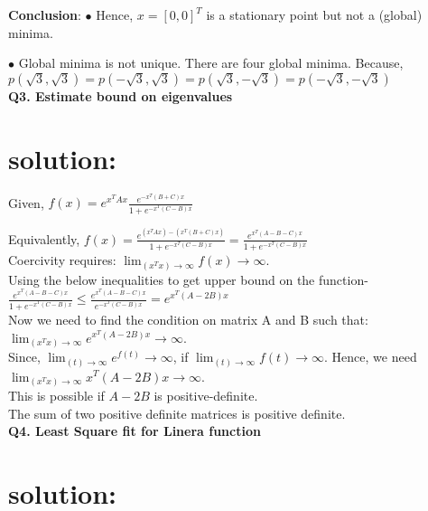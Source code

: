 \documentclass{article}%
\begin{document}
\textbf{Conclusion}: 
$\bullet$ Hence, $x=[0,0]^T$ is a stationary point but not a (global) minima.

$\bullet$ Global minima is not unique. There are four global minima. Because, $p(\sqrt{3},\sqrt{3})=p(-\sqrt{3},\sqrt{3})=p(\sqrt{3},-\sqrt{3})=p(-\sqrt{3},-\sqrt{3})$\\


\newpage
\textbf{Q3. Estimate bound on eigenvalues}
\section*{solution:}

Given, $f(x)=e^{x^TAx}\frac{e^{-x^T(B+C)x}}{1+e^{-x^T(C-B)x}}$

Equivalently, $f(x)=\frac{e^{(x^TAx)-(x^T(B+C)x)}}{1+e^{-x^T(C-B)x}}= \frac{e^{x^T(A-B-C)x}}{1+e^{-x^T(C-B)x}}$\\

Coercivity requires: $\lim_{(x^Tx)\to\infty} f(x)\to\infty$.\\

Using the below inequalities to get upper bound on the function-\\

$\frac{e^{x^T(A-B-C)x}}{1+e^{-x^T(C-B)x}} \leq \frac{e^{x^T(A-B-C)x}}{e^{-x^T(C-B)x}} = e^{x^T(A-2B)x}$\\


Now we need to find the condition on matrix A and B such that:\\

$\lim_{(x^Tx)\to\infty} e^{x^T(A-2B)x}\to\infty$.\\

Since, $\lim_{(t)\to\infty} e^{f(t)}\to\infty$, if $\lim_{(t)\to\infty} {f(t)}\to\infty$. Hence, we need $\lim_{(x^Tx)\to\infty} {x^T(A-2B)x}\to\infty$.\\

This is possible if $A-2B$ is positive-definite.\\

The sum of two positive definite matrices is positive definite.\\



\newpage
\textbf{Q4. Least Square fit for Linera function}
\section*{solution:} \\
\end{document}
